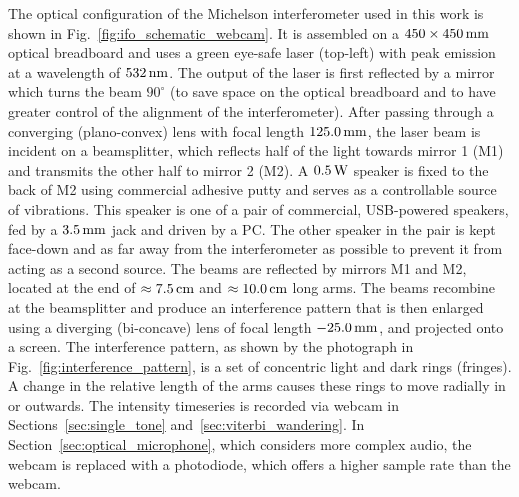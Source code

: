 \documentclass[paper-main.tex]{subfiles}
\begin{document}
The optical configuration of the Michelson interferometer used in this work is shown in Fig.~\ref{fig:ifo_schematic_webcam}.
It is assembled on a $450 \times 450 \,{\rm mm} $ optical breadboard and uses a green eye-safe laser (top-left) with peak emission at a wavelength of $532\,{\rm nm}$.
The output of the laser is first reflected by a mirror which turns the beam $90^{\circ}$ (to save space on the optical breadboard and to have greater control of the alignment of the interferometer).
After passing through a converging (plano-convex) lens with focal length $125.0\,{\rm mm}$, the laser beam is incident on a beamsplitter, which reflects half of the light towards mirror 1 (M1) and transmits the other half to mirror 2 (M2). 
A $0.5\,{\rm W}$ speaker is fixed to the back of M2 using commercial adhesive putty and serves as a controllable source of vibrations. 
This speaker is one of a pair of commercial, USB-powered speakers, fed by a $3.5\,{\rm mm}$ jack and driven by a PC. 
The other speaker in the pair is kept face-down and as far away from the interferometer as possible to prevent it from acting as a second source.
The beams are reflected by mirrors M1 and M2, located at the end of $\approx 7.5\,{\rm cm}$ and $\approx 10.0\,{\rm cm}$ long arms.
The beams recombine at the beamsplitter and produce an interference pattern that is then enlarged using a diverging (bi-concave) lens of focal length $-25.0\,{\rm mm}$, and projected onto a screen.
The interference pattern, as shown by the photograph in Fig.~\ref{fig:interference_pattern}, is a set of concentric light and dark rings (fringes). 
A change in the relative length of the arms causes these rings to move radially in or outwards.
The intensity timeseries is recorded via webcam in Sections~\ref{sec:single_tone} and~\ref{sec:viterbi_wandering}.
In Section~\ref{sec:optical_microphone}, which considers more complex audio, the webcam is replaced with a photodiode, which offers a higher sample rate than the webcam. 
\end{document}
